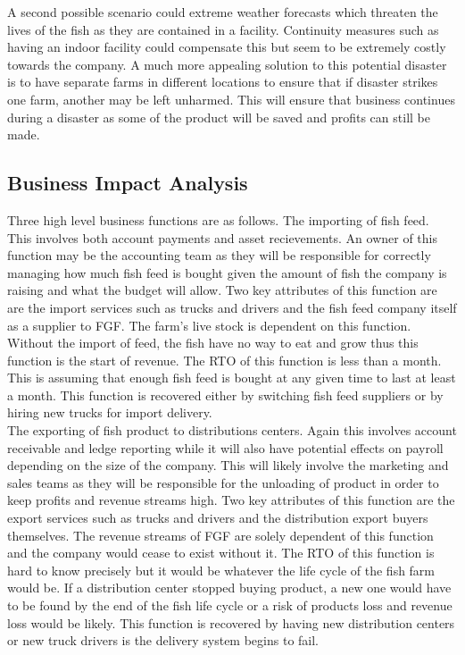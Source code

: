 \documentclass[paper=a4, fontsize=11pt]{scrartcl} %
\numberwithin{equation}{section} %
\numberwithin{figure}{section} %
\numberwithin{table}{section} %
\begin{document}
A second possible scenario could extreme weather forecasts which threaten the lives of the fish
as they are contained in a facility. Continuity measures such as having an indoor facility
could compensate this but seem to be extremely costly towards the company. A much more appealing
solution to this potential disaster is to have separate farms in different locations to ensure
that if disaster strikes one farm, another may be left unharmed. This will ensure that business
continues during a disaster as some of the product will be saved and profits can still be made.\\

\subsection{Business Impact Analysis}

Three high level business functions are as follows. The importing of fish feed. This involves
both account payments and asset recievements. An owner of this function may be the accounting
team as they will be responsible for correctly managing how much fish feed is bought given the amount
of fish the company is raising and what the budget will allow. Two key attributes of this function
are are the import services such as trucks and drivers and the fish feed company itself as a
supplier to FGF. The farm's live stock is dependent on this function. Without the import of feed,
the fish have no way to eat and grow thus this function is the start of revenue. The RTO of this
function is less than a month. This is assuming that enough fish feed is bought at any given time
to last at least a month. This function is recovered either by switching fish feed suppliers or
by hiring new trucks for import delivery.\\

The exporting of fish product to distributions
centers. Again this involves account receivable and ledge reporting while it will also have potential
effects on payroll depending on the size of the company. This will likely involve the marketing and
sales teams as they will be responsible for the unloading of product in order to keep profits and
revenue streams high. Two key attributes of this function are the export services such as trucks
and drivers and the distribution export buyers themselves. The revenue streams of FGF are solely
dependent of this function and the company would cease to exist without it. The RTO of this 
function is hard to know precisely but it would be whatever the life cycle of the fish farm
would be. If a distribution center stopped buying product, a new one would have to be found
by the end of the fish life cycle or a risk of products loss and revenue loss would be likely.
This function is recovered by having new distribution centers or new truck drivers is the 
delivery system begins to fail.\\
\end{document}
